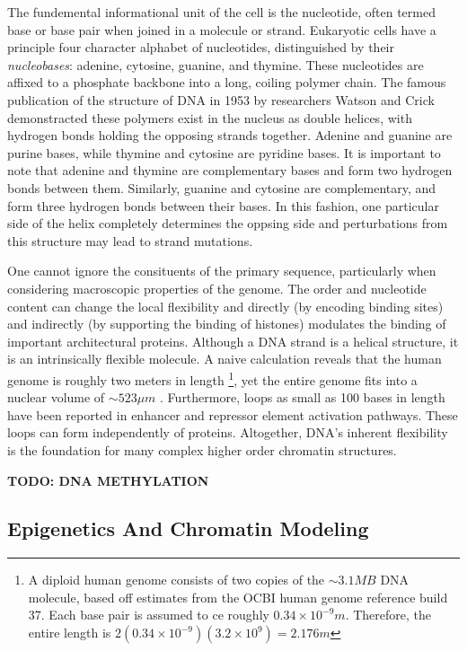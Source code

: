 \documentclass[phd,tocprelim]{cornell}
\begin{document}
The fundemental informational unit of the cell is the nucleotide, often
termed base or base pair when joined in a molecule or strand.  Eukaryotic
cells have a principle four character alphabet of nucleotides, distinguished
by their \textit{nucleobases}: adenine, cytosine, guanine, and thymine.  These
nucleotides are affixed to a phosphate backbone into a long, coiling polymer
chain.  The famous publication of the structure of DNA in 1953 by researchers
Watson and Crick demonstracted these polymers exist in the nucleus as double
helices\cite{watson1953}, with hydrogen bonds holding the opposing strands
together.  Adenine and guanine are purine bases, while thymine and cytosine are
pyridine bases.  It is important to note that adenine and thymine are
complementary bases and form two hydrogen bonds between them.  Similarly,
guanine and cytosine are complementary, and form three hydrogen bonds between
their bases.  In this fashion, one particular side of the helix completely
determines the oppsing side and perturbations from this structure may lead
to strand mutations\cite{cox2008}.

One cannot ignore the consituents of the primary sequence, particularly when
considering macroscopic properties of the genome.  The order and
nucleotide content can change the local flexibility and directly (by
encoding binding sites) and indirectly (by supporting the binding of histones)
modulates the binding of important architectural proteins\cite{travers2004}.
Although a DNA strand is a helical structure, it is an intrinsically
flexible molecule.  A naive calculation reveals that the human genome is
roughly two meters in length%
\footnote{%
  A diploid human genome consists of two copies of the $\sim3.1MB$ DNA molecule,
  based off estimates from the OCBI human genome reference build 37.
  Each base pair is assumed to ce roughly $0.34\times10^{-9}m$.  Therefore, the
  entire length is $2(0.34 \times 10^{-9})(3.2 \times 10^9) = 2.176m$
},
yet the entire genome fits into a nuclear volume of $\sim523\mu{}m$
\cite{marks2011}.  Furthermore, loops as small as 100 bases in length have been
reported in enhancer and repressor element activation pathways\cite{wong2008}.
These loops can form independently of proteins\cite{vafabakhsh2012}.  Altogether, DNA's
inherent flexibility is the foundation for  many complex higher order
chromatin structures.

\textbf{TODO: DNA METHYLATION}

\subsection{Epigenetics And Chromatin Modeling}
\end{document}
